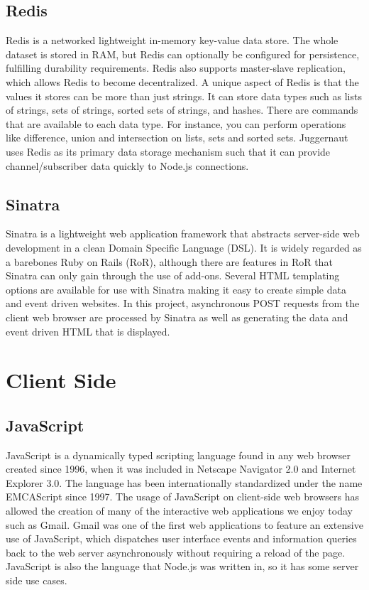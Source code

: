 \documentclass[12pt]{report}	%
\theoremstyle{definition}
\theoremstyle{remark}
\begin{document}
\subsection{Redis}

Redis is a networked lightweight in-memory key-value data store. The
whole dataset is stored in RAM, but Redis can optionally be configured
for persistence, fulfilling durability requirements. Redis also supports
master-slave replication, which allows Redis to become decentralized. A
unique aspect of Redis is that the values it stores can be more than
just strings. It can store data types such as lists of strings, sets of
strings, sorted sets of strings, and hashes. There are commands that are
available to each data type. For instance, you can perform operations
like difference, union and intersection on lists, sets and sorted sets.
Juggernaut uses Redis as its primary data storage mechanism such that it
can provide channel/subscriber data quickly to Node.js connections.

\subsection{Sinatra}

Sinatra is a lightweight web application framework that abstracts
server-side web development in a clean Domain Specific Language (DSL).
It is widely regarded as a barebones Ruby on Rails (RoR), although there are
features in RoR that Sinatra can only gain through the use of add-ons.
Several HTML templating options are available for use with Sinatra
making it easy to create simple data and event driven websites. In this
project, asynchronous POST requests from the client web browser are
processed by Sinatra as well as generating the data and event driven
HTML that is displayed.

\section{Client Side}

\subsection{JavaScript}

JavaScript is a dynamically typed scripting language found in any web
browser created since 1996, when it was included in Netscape Navigator
2.0 and Internet Explorer 3.0. The language has been internationally
standardized under the name EMCAScript since 1997. The usage of
JavaScript on client-side web browsers has allowed the creation of
many of the interactive web applications we enjoy today such as Gmail.
Gmail was one of the first web applications to feature an extensive use
of JavaScript, which dispatches user interface events and information
queries back to the web server asynchronously without requiring a reload
of the page. JavaScript is also the language that Node.js was written
in, so it has some server side use cases.
\end{document}
